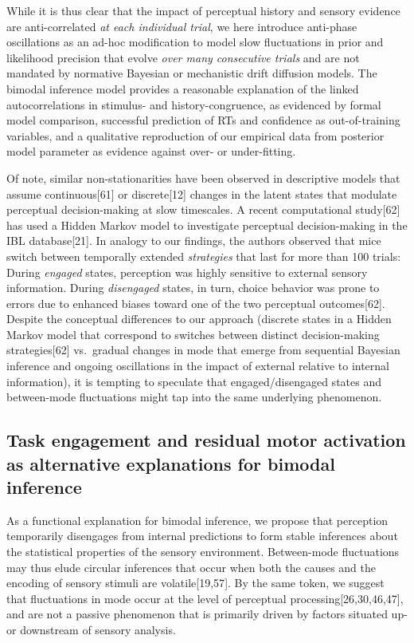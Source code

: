 \documentclass[
]{article}
\begin{document}
While it is thus clear that the impact of perceptual history and sensory
evidence are anti-correlated \emph{at each individual trial}, we here
introduce anti-phase oscillations as an ad-hoc modification to model
slow fluctuations in prior and likelihood precision that evolve
\emph{over many consecutive trials} and are not mandated by normative
Bayesian or mechanistic drift diffusion models. The bimodal inference
model provides a reasonable explanation of the linked autocorrelations
in stimulus- and history-congruence, as evidenced by formal model
comparison, successful prediction of RTs and confidence as
out-of-training variables, and a qualitative reproduction of our
empirical data from posterior model parameter as evidence against over-
or under-fitting.

Of note, similar non-stationarities have been observed in descriptive
models that assume continuous{[}61{]} or discrete{[}12{]} changes in the
latent states that modulate perceptual decision-making at slow
timescales. A recent computational study{[}62{]} has used a Hidden
Markov model to investigate perceptual decision-making in the IBL
database{[}21{]}. In analogy to our findings, the authors observed that
mice switch between temporally extended \emph{strategies} that last for
more than 100 trials: During \emph{engaged} states, perception was
highly sensitive to external sensory information. During
\emph{disengaged} states, in turn, choice behavior was prone to errors
due to enhanced biases toward one of the two perceptual
outcomes{[}62{]}. Despite the conceptual differences to our approach
(discrete states in a Hidden Markov model that correspond to switches
between distinct decision-making strategies{[}62{]} vs.~gradual changes
in mode that emerge from sequential Bayesian inference and ongoing
oscillations in the impact of external relative to internal
information), it is tempting to speculate that engaged/disengaged states
and between-mode fluctuations might tap into the same underlying
phenomenon.

\hypertarget{task-engagement-and-residual-motor-activation-as-alternative-explanations-for-bimodal-inference}{%
\subsection{Task engagement and residual motor activation as alternative
explanations for bimodal
inference}\label{task-engagement-and-residual-motor-activation-as-alternative-explanations-for-bimodal-inference}}

As a functional explanation for bimodal inference, we propose that
perception temporarily disengages from internal predictions to form
stable inferences about the statistical properties of the sensory
environment. Between-mode fluctuations may thus elude circular
inferences that occur when both the causes and the encoding of sensory
stimuli are volatile{[}19,57{]}. By the same token, we suggest that
fluctuations in mode occur at the level of perceptual
processing{[}26,30,46,47{]}, and are not a passive phenomenon that is
primarily driven by factors situated up- or downstream of sensory
analysis.
\end{document}
